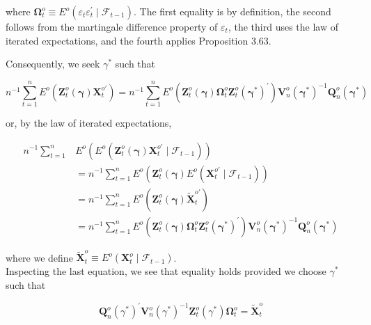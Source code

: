 \documentclass[10pt]{article}
\begin{document}
where $\boldsymbol{\Omega}_{t}^{o} \equiv E^{o}\left(\varepsilon_{t} \varepsilon_{t}^{\prime} \mid \mathcal{F}_{t-1}\right)$. The first equality is by definition, the second follows from the martingale difference property of $\varepsilon_{t}$, the third uses the law of iterated expectations, and the fourth applies Proposition 3.63.

Consequently, we seek $\gamma^{*}$ such that

$$
n^{-1} \sum_{t=1}^{n} E^{o}\left(\mathbf{Z}_{t}^{o}(\boldsymbol{\gamma}) \mathbf{X}_{t}^{o \prime}\right)=n^{-1} \sum_{t=1}^{n} E^{o}\left(\mathbf{Z}_{t}^{o}(\boldsymbol{\gamma}) \boldsymbol{\Omega}_{t}^{o} \mathbf{Z}_{t}^{o}\left(\boldsymbol{\gamma}^{*}\right)^{\prime}\right) \mathbf{V}_{n}^{o}\left(\boldsymbol{\gamma}^{*}\right)^{-1} \mathbf{Q}_{n}^{o}\left(\boldsymbol{\gamma}^{*}\right)
$$

or, by the law of iterated expectations,

$$
\begin{aligned}
n^{-1} \sum_{t=1}^{n} & E^{o}\left(E^{o}\left(\mathbf{Z}_{t}^{o}(\boldsymbol{\gamma}) \mathbf{X}_{t}^{o \prime} \mid \mathcal{F}_{t-1}\right)\right) \\
& =n^{-1} \sum_{t=1}^{n} E^{o}\left(\mathbf{Z}_{t}^{o}(\boldsymbol{\gamma}) E^{o}\left(\mathbf{X}_{t}^{o \prime} \mid \mathcal{F}_{t-1}\right)\right) \\
& =n^{-1} \sum_{t=1}^{n} E^{o}\left(\mathbf{Z}_{t}^{o}(\boldsymbol{\gamma}) \tilde{\mathbf{X}}_{t}^{o \prime}\right) \\
& =n^{-1} \sum_{t=1}^{n} E^{o}\left(\mathbf{Z}_{t}^{o}(\boldsymbol{\gamma}) \boldsymbol{\Omega}_{t}^{o} \mathbf{Z}_{t}^{o}\left(\boldsymbol{\gamma}^{*}\right)^{\prime}\right) \mathbf{V}_{n}^{o}\left(\boldsymbol{\gamma}^{*}\right)^{-1} \mathbf{Q}_{n}^{o}\left(\boldsymbol{\gamma}^{*}\right)
\end{aligned}
$$

where we define $\tilde{\mathbf{X}}_{t}^{o} \equiv E^{o}\left(\mathbf{X}_{t}^{o} \mid \mathcal{F}_{t-1}\right)$.\\
Inspecting the last equation, we see that equality holds provided we choose $\gamma^{*}$ such that


\begin{equation*}
\mathbf{Q}_{n}^{o}\left(\gamma^{*}\right)^{\prime} \mathbf{V}_{n}^{o}\left(\gamma^{*}\right)^{-1} \mathbf{Z}_{t}^{o}\left(\gamma^{*}\right) \boldsymbol{\Omega}_{t}^{o}=\tilde{\mathbf{X}}_{t}^{o} \tag{4.3}
\end{equation*}
\end{document}
